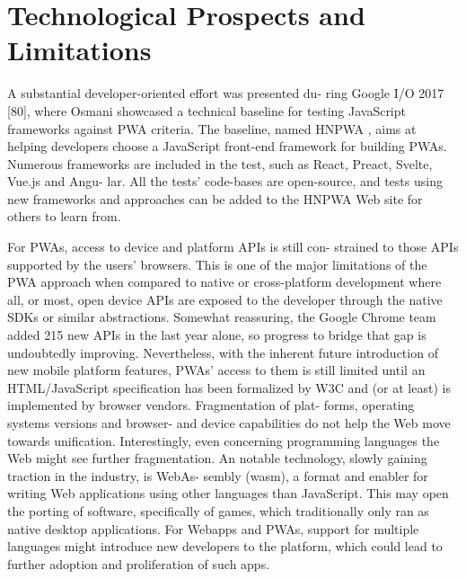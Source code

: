 \documentclass[14pt,a4paper,final]{extreport}
\begin{document}
\chapter{Technological Prospects and Limitations}
A substantial developer-oriented effort was presented du- ring Google I/O 2017 [80], where Osmani showcased a technical baseline for testing JavaScript frameworks against PWA criteria. The baseline, named HNPWA , aims at helping developers choose a JavaScript front-end framework for building PWAs. Numerous frameworks are included in the test, such as React, Preact, Svelte, Vue.js and Angu- lar. All the tests’ code-bases are open-source, and tests using new frameworks and approaches can be added to the HNPWA Web site for others to learn from.
\item 
\newline
For PWAs, access to device and platform APIs is still con- strained to those APIs supported by the users’ browsers. This is one of the major limitations of the PWA approach when compared to native or cross-platform development where all, or most, open device APIs are exposed to the developer through the native SDKs or similar abstractions. Somewhat reassuring, the Google Chrome team added 215 new APIs in the last year alone, so progress to bridge that gap is undoubtedly improving. Nevertheless, with the inherent future introduction of new mobile platform features, PWAs’ access to them is still limited until an HTML/JavaScript specification has been formalized by W3C and (or at least) is implemented by browser vendors. Fragmentation of plat- forms, operating systems versions and browser- and device capabilities do not help the Web move towards unification.
Interestingly, even concerning programming languages the Web might see further fragmentation. An notable technology, slowly gaining traction in the industry, is WebAs- sembly (wasm), a format and enabler for writing Web applications using other languages than JavaScript. This may open the porting of software, specifically of games, which traditionally only ran as native desktop applications. For Webapps and PWAs, support for multiple languages might introduce new developers to the platform, which could lead to further adoption and proliferation of such apps.
\end{document}
